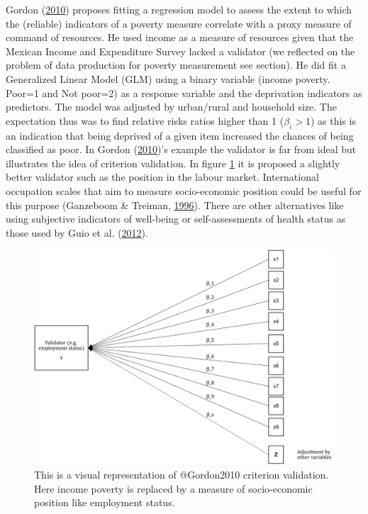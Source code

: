 \documentclass[]{book}
\begin{document}
Gordon (\protect\hyperlink{ref-Gordon2010}{2010}) proposes fitting a regression model to assess the extent to which the (reliable) indicators of a poverty measure correlate with a proxy measure of command of resources. He used income as a measure of resources given that the Mexican Income and Expenditure Survey lacked a validator (we reflected on the problem of data production for poverty measurement see section). He did fit a Generalized Linear Model (GLM) using a binary variable (income poverty. Poor=1 and Not poor=2) as a response variable and the deprivation indicators as predictors. The model was adjusted by urban/rural and household size. The expectation thus was to find relative risks ratios higher than 1 (\(\beta_i>1\)) as this is an indication that being deprived of a given item increased the chances of being classified as poor. In Gordon (\protect\hyperlink{ref-Gordon2010}{2010})'s example the validator is far from ideal but illustrates the idea of criterion validation. In figure \ref{fig:valgordon} it is proposed a slightly better validator such as the position in the labour market. International occupation scales that aim to measure socio-economic position could be useful for this purpose (Ganzeboom \& Treiman, \protect\hyperlink{ref-Ganzeboom1996}{1996}). There are other alternatives like using subjective indicators of well-being or self-assessments of health status as those used by Guio et al. (\protect\hyperlink{ref-Guio2012}{2012}).

\begin{figure}[H]

{\centering \includegraphics[width=\textwidth]{val_gordon} 

}

\caption{This is a visual representation of @Gordon2010 criterion validation. Here income poverty is replaced by a measure of socio-economic position like employment status.}\label{fig:valgordon}
\end{figure}
\end{document}
